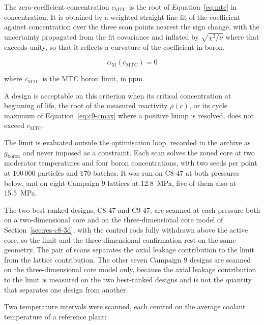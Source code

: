 The zero-coefficient concentration $c_\mathrm{MTC}$ is the root of
Equation~\eqref{eq:mtc} in concentration. It is obtained by a weighted
straight-line fit of the coefficient against concentration over the
three scan points nearest the sign change, with the uncertainty
propagated from the fit covariance and inflated by $\sqrt{\chi^2/\nu}$
where that exceeds unity, so that it reflects a curvature of the
coefficient in boron.

\begin{equation}
\alpha_\mathrm{M}\!\left(c_\mathrm{MTC}\right) = 0
\label{eq:ceiling}
\end{equation}

\noindent where $c_\mathrm{MTC}$ is the MTC boron limit, in ppm.

A design is acceptable on this criterion when its critical concentration
at beginning of life, the root of the measured reactivity $\rho(c)$, or
its cycle maximum of Equation~\eqref{eq:c9-cmax} where a positive hump
is resolved, does not exceed $c_\mathrm{MTC}$.

The limit is evaluated outside the optimisation loop, recorded in the
archive as $g_\mathrm{boron}$ and never imposed as a constraint. Each
scan solves the zoned core at two moderator temperatures and four boron
concentrations, with two seeds per point at $100\,000$ particles and 170
batches. It was run on C8-47 at both pressures below, and on eight
Campaign 9 lattices at \SI{12.8}{MPa}, five of them also at
\SI{15.5}{MPa}.

The two best-ranked designs, C8-47 and C9-47, are scanned at each pressure both on
a two-dimensional core and on the three-dimensional core model of
Section~\ref{sec:res-c8-3d}, with the control rods fully withdrawn above the active core, so the
limit and the three-dimensional confirmation rest on the same geometry.
The pair of scans separates the axial leakage contribution to the limit
from the lattice contribution. The other seven Campaign 9 designs are
scanned on the three-dimensional core model only, because the axial
leakage contribution to the limit is measured on the two best-ranked
designs and is not the quantity that separates one design from another.

Two temperature intervals were scanned, each centred on the average
coolant temperature of a reference plant:

